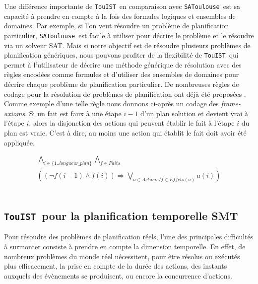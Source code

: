 \documentclass{iaf}
\newcommand{\satoulouse}{{\sc Satoulouse}\xspace}
\renewcommand{\satoulouse}{{\sc \texttt {SAToulouse}}}
\newcommand{\nameTool}{{\sc \texttt {TouIST}}}
\begin{document}
Une diff\'erence importante de \nameTool\, en comparaison avec \satoulouse\, est sa capacit\'e \`a prendre en compte \`a la fois des formules logiques et ensembles de domaines. Par exemple, si l'on veut r\'esoudre un probl\`eme de planification particulier, \satoulouse\ est facile \`a utiliser pour d\'ecrire le probl\`eme et le r\'esoudre via un solveur SAT. Mais si notre objectif est de r\'esoudre plusieurs probl\`emes de planification g\'en\'eriques, nous pouvons profiter de la flexibilit\'e de \nameTool\ qui permet \`a l'utilisateur de d\'ecrire une m\'ethode g\'en\'erique de r\'esolution avec des r\`egles encod\'ees comme formules et d'utiliser des ensembles de domaines pour d\'ecrire chaque probl\`eme de planification particulier. De nombreuses r\`egles de codage pour la r\'esolution de probl\`emes de planification ont d\'ej\`a \'et\'e propos\'ees \cite{kautzS92_planning_sat,MaliK99_plan_space_encodings,Rintanen:2006}. Comme exemple d'une telle r\`egle nous donnons ci-apr\`es un codage des \emph{frame-axioms}. Si un fait est faux \`a une \'etape $i-1$ d'un plan solution et devient vrai \`a l'\'etape $i$, alors la disjonction des actions qui peuvent \'etablir le fait \`a l'\'etape $i$ du plan est vraie. C'est \`a dire, au moins une action qui \'etablit le fait doit avoir \'et\'e appliqu\'ee.


  \[\begin{aligned}\bigwedge_{i\in\{1..longueur\_plan\}}
  \bigwedge_{f\in Faits} \hspace{4cm}\\
  \left((\lnot f(i-1) \wedge f(i)) \Rightarrow 
  \bigvee_{a\in Actions / f\in Effets(a)} a(i)\right)\end{aligned}\]
\\


\subsection{\nameTool\ pour la planification temporelle SMT}

Pour r\'esoudre des probl\`emes de planification r\'eels, l'une des principales difficult\'es \`a surmonter consiste \`a prendre en compte la dimension temporelle. En effet, de nombreux probl\`emes du monde r\'eel n\'ecessitent, pour \^{e}tre r\'esolus ou ex\'ecut\'es plus efficacement, la prise en compte de la dur\'ee des actions, des instants auxquels des \'ev\`enements se produisent, ou encore la concurrence d'actions.
\end{document}
